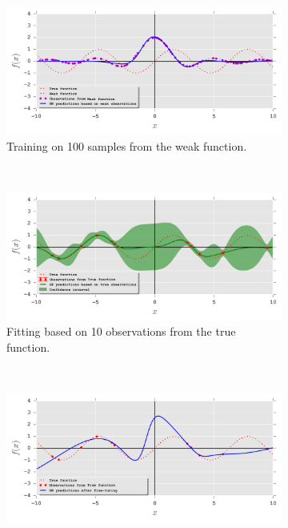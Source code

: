 \begin{figure}[!t]%
    \centering
    \begin{subfigure}[t]{0.74\textwidth}
        \centering
        \includegraphics[trim={0 0.3cm 0 0},clip,width=1\textwidth]{03-part-02/chapter-05/figs_and_tables/fig_toy_ex_plot1.png}
        \caption{\label{fig:toy_plot1}Training \std on 100 samples from the weak function.}
    \end{subfigure}%
   \\
    \begin{subfigure}[t]{0.74\textwidth}
        \centering
        \includegraphics[trim={0 0.3cm 0 0},clip,width=1\textwidth]{03-part-02/chapter-05/figs_and_tables/fig_toy_ex_plot2.png}
        \caption{\label{fig:toy_plot2}Fitting \tch based on 10 observations from the true function.}
    \end{subfigure}%
    \\
    \begin{subfigure}[t]{0.74\textwidth}
        \centering
        \includegraphics[trim={0 0.3cm 0 0},clip,width=1\textwidth]{03-part-02/chapter-05/figs_and_tables/fig_toy_ex_plot3.png}

\end{subfigure}
\end{figure}

